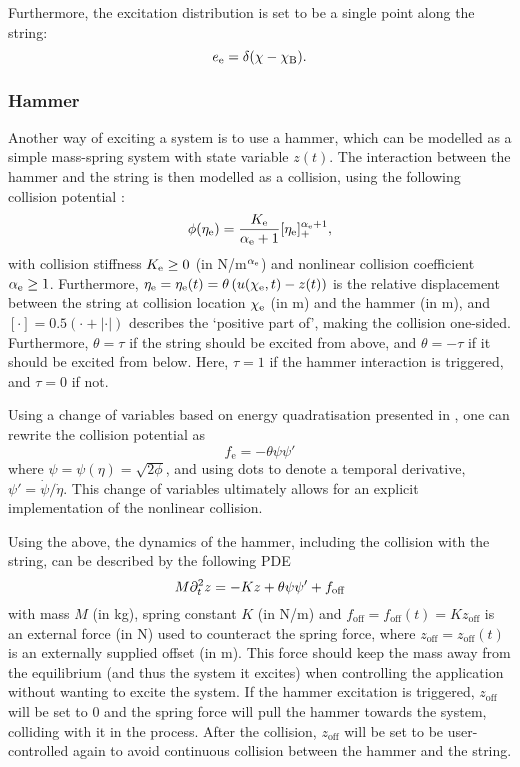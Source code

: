 \documentclass{article}
\begin{document}
Furthermore, the excitation distribution is set to be a single point along the string:
\begin{equation}
    e_\text{e} = \delta(\chi - \chi_{\text{B}}).
\end{equation}

\subsubsection{Hammer}
Another way of exciting a system is to use a hammer, which can be modelled as a simple mass-spring system with state variable $z(t)$. The interaction between the hammer and the string is then modelled as a collision, using the following collision potential \cite{Hertz1881}:
\begin{equation}\label{eq:potential}
    \phi(\eta_{\text{e}}) = \frac{K_{\text{e}}}{\alpha_{\text{e}}+1}[\eta_{\text{e}}]_+^{\alpha_{\text{e}}+1},
\end{equation}
with collision stiffness $K_{\text{e}} \geq 0$ (in N/m$^{\alpha_{\text{e}}}$) and nonlinear collision coefficient $\alpha_{\text{e}} \geq 1$. Furthermore, $\eta_{\text{e}} = \eta_{\text{e}}(t) = \theta\left(u(\chi_{\text{e}}, t) - z(t)\right)$ is the relative displacement between the string at collision location $\chi_{\text{e}}$ (in m) and the hammer (in m), and $[\cdot] = 0.5 (\cdot + |\cdot|)$ describes the `positive part of', making the collision one-sided. Furthermore, $\theta = \tau$ if the string should be excited from above, and $\theta = -\tau$ if it should be excited from below. Here, $\tau = 1$ if the hammer interaction is triggered, and $\tau = 0$ if not.  

Using a change of variables based on energy quadratisation presented in \cite{Ducceschi2021}, one can rewrite the collision potential as
\begin{equation}
    f_\text{e} = -\theta\psi \psi'
\end{equation}
where $\psi = \psi(\eta) = \sqrt{2\phi}$, and using dots to denote a temporal derivative, $\psi' = \dot \psi / \dot \eta$. This change of variables ultimately allows for an explicit implementation of the nonlinear collision. 

Using the above, the dynamics of the hammer, including the collision with the string, can be described by the following PDE
\begin{equation}
    M\partial_t^2 z = -K z + \theta \psi\psi' + f_\text{off}
\end{equation}
with mass $M$ (in kg), spring constant $K$ (in N/m) and $f_\text{off} = f_\text{off}(t) = K z_\text{off}$ is an external force (in N) used to counteract the spring force, where $z_\text{off} = z_\text{off}(t)$ is an externally supplied offset (in m). This force should keep the mass away from the equilibrium (and thus the system it excites) when controlling the application without wanting to excite the system. If the hammer excitation is triggered, $z_\text{off}$ will be set to $0$ and the spring force will pull the hammer towards the system, colliding with it in the process. After the collision, $z_\text{off}$ will be set to be user-controlled again to avoid continuous collision between the hammer and the string. 
\end{document}
